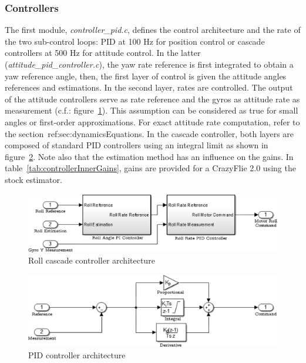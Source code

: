 \documentclass[a4paper, 12pt]{report}
\begin{document}
\subsubsection{Controllers}
The first module, \emph{controller\_pid.c}, defines the control architecture and the rate of the two sub-control loops: PID at 100 Hz for position control or cascade controllers at 500 Hz for attitude control. In the latter (\emph{attitude\_pid\_controller.c}), the yaw rate reference is first integrated to obtain a yaw reference angle, then, the first layer of control is given the attitude angles references and estimations. In the second layer, rates are controlled. The output of the attitude controllers serve as rate reference and the gyros as attitude rate as measurement (c.f.: figure~\ref{fig:controllerCascade}). This assumption can be considered as true for small angles or first-order approximations. For exact attitude rate computation, refer to the section~ref:{sec:dynamicsEquations}.  In the cascade controller, both layers  are composed of standard PID controllers using an integral limit as shown in figure~\ref{fig:controllerPID}. Note also that the estimation method has an influence on the gains. In table~\ref{tab:controllerInnerGains}, gains are provided for a CrazyFlie 2.0 using the stock estimator.

\begin{figure}[h]
\centering
\includegraphics[scale = 0.8]{Images/controllerCascade}
\caption{Roll cascade controller architecture}
\label{fig:controllerCascade}
\end{figure}

\begin{figure}[h]
\centering
\includegraphics[scale = 0.8]{Images/controllerPID}
\caption{PID controller architecture}
\label{fig:controllerPID}
\end{figure}
\end{document}

